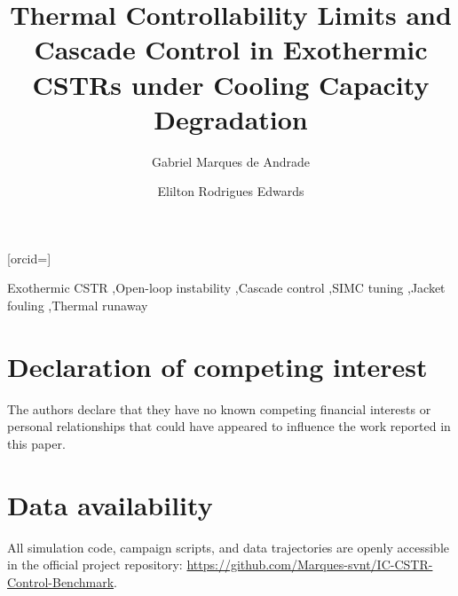 \documentclass[a4paper,fleqn]{cas-dc}
\begin{document}
\let\WriteBookmarks\relax
\def\floatpagepagefraction{1}
\def\textpagefraction{.001}

\title [mode = title]{Thermal Controllability Limits and Cascade Control in Exothermic CSTRs under Cooling Capacity Degradation}

\author[1]{Gabriel Marques de Andrade}[orcid=]
\cormark[1]

\author[1]{Elilton Rodrigues Edwards}







\begin{keywords}
Exothermic CSTR \sep Open-loop instability \sep Cascade control \sep SIMC tuning \sep Jacket fouling \sep Thermal runaway
\end{keywords}

\maketitle








{\sloppy\printcredits}

\section*{Declaration of competing interest}
The authors declare that they have no known competing financial interests or personal relationships that could have appeared to influence the work reported in this paper.

\section*{Data availability}
{\sloppy All simulation code, campaign scripts, and data trajectories are openly accessible in the official project repository: \url{https://github.com/Marques-svnt/IC-CSTR-Control-Benchmark}.\par}



\end{document}
